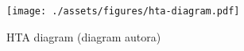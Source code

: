 \begin{landscape}
    \begin{figure}[p]
        \centering
        \texttt{[image: ./assets/figures/hta-diagram.pdf]}
        \captionsetup{justification=centering}
        \caption[HTA diagram vývoje knihovny]{HTA diagram (diagram autora)}
        \label{fig:hta}
    \end{figure}
\end{landscape}
